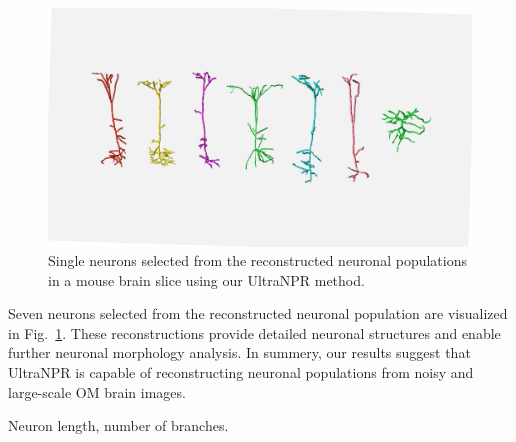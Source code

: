 \begin{figure}[t]
	\centering
	\includegraphics[width=1\columnwidth]{./Illustrations/single_neurons4.pdf}
	\caption{Single neurons selected from the reconstructed neuronal populations in a mouse brain slice using our UltraNPR method.}
	\label{fig:single_neurons}
\end{figure}

Seven neurons selected from the reconstructed neuronal population are visualized in Fig.~\ref{fig:single_neurons}. These reconstructions provide detailed neuronal structures and enable further neuronal morphology analysis. 
In summery, our results suggest that UltraNPR is capable of reconstructing neuronal populations from noisy and large-scale OM brain images.

Neuron length, number of branches.

